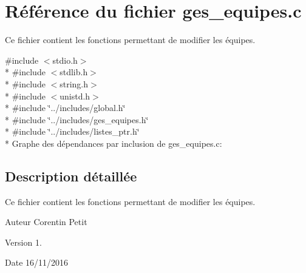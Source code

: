 \hypertarget{a00018}{}\section{Référence du fichier ges\+\_\+equipes.\+c}
\label{a00018}


Ce fichier contient les fonctions permettant de modifier les équipes.  


{\ttfamily \#include $<$stdio.\+h$>$}\\*
{\ttfamily \#include $<$stdlib.\+h$>$}\\*
{\ttfamily \#include $<$string.\+h$>$}\\*
{\ttfamily \#include $<$unistd.\+h$>$}\\*
{\ttfamily \#include \char`\"{}../includes/global.\+h\char`\"{}}\\*
{\ttfamily \#include \char`\"{}../includes/ges\+\_\+equipes.\+h\char`\"{}}\\*
{\ttfamily \#include \char`\"{}../includes/listes\+\_\+ptr.\+h\char`\"{}}\\*
Graphe des dépendances par inclusion de ges\+\_\+equipes.\+c\+:


\subsection{Description détaillée}
Ce fichier contient les fonctions permettant de modifier les équipes. 

\begin{DoxyAuthor}{Auteur}
Corentin Petit 
\end{DoxyAuthor}
\begin{DoxyVersion}{Version}
1. 
\end{DoxyVersion}
\begin{DoxyDate}{Date}
16/11/2016 
\end{DoxyDate}
